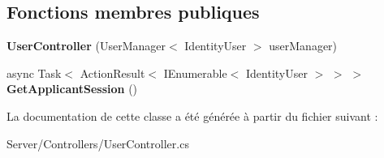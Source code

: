 \subsection*{Fonctions membres publiques}
\begin{DoxyCompactItemize}
\item 
\mbox{\label{class_mediwatch_1_1_server_1_1_controllers_1_1_user_controller_a0824f509c1d9292e4cf6aab3fcf4e659}} 
{\bfseries User\+Controller} (User\+Manager$<$ Identity\+User $>$ user\+Manager)
\item 
\mbox{\label{class_mediwatch_1_1_server_1_1_controllers_1_1_user_controller_a09c0ab1a896d65d586d34ac6270a2b5c}} 
async Task$<$ Action\+Result$<$ I\+Enumerable$<$ Identity\+User $>$ $>$ $>$ {\bfseries Get\+Applicant\+Session} ()
\end{DoxyCompactItemize}


La documentation de cette classe a été générée à partir du fichier suivant \+:\begin{DoxyCompactItemize}
\item 
Server/\+Controllers/User\+Controller.\+cs\end{DoxyCompactItemize}
